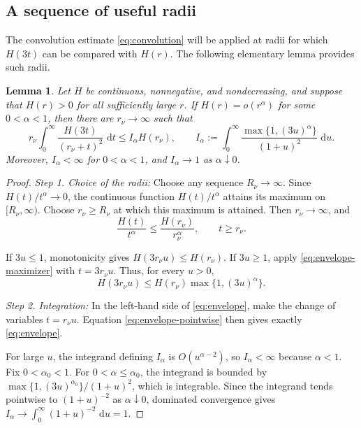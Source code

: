 \documentclass[12pt,letterpaper,reqno]{amsart}
\newtheorem{lem}[thm]{Lemma}
\theoremstyle{definition}
\numberwithin{equation}{section}
\newcommand{\dd}{\,\mathrm d}
\begin{document}
\subsection{A sequence of useful radii}

The convolution estimate \eqref{eq:convolution} will be applied at
radii for which \(H(3t)\) can be compared with \(H(r)\). The following
elementary lemma provides such radii.

\begin{lem}\label{lem:envelope}
Let \(H\) be continuous, nonnegative, and nondecreasing, and suppose
that \(H(r)>0\) for all sufficiently large \(r\). If
\(H(r)=o(r^\alpha)\) for some \(0<\alpha<1\), then there are
\(r_\nu\to\infty\) such that
\begin{equation}\label{eq:envelope}
 r_\nu\int_0^\infty
 \frac{H(3t)}{(r_\nu+t)^2}\,\dd t
 \leq
 I_\alpha H(r_\nu),
 \qquad
 I_\alpha
 :=
 \int_0^\infty
 \frac{\max\{1,(3u)^\alpha\}}{(1+u)^2}\,\dd u.
\end{equation}
Moreover, \(I_\alpha<\infty\) for \(0<\alpha<1\), and
\(I_\alpha\to1\) as \(\alpha\downarrow0\).
\end{lem}

\begin{proof}

\medskip\noindent
\emph{{Step 1. Choice of the radii:}}
Choose any sequence \(R_\nu\to\infty\). Since
\(H(t)/t^\alpha\to0\), the continuous function
\(H(t)/t^\alpha\) attains its maximum on \([R_\nu,\infty)\).
Choose \(r_\nu\geq R_\nu\) at which this maximum is attained. Then
\(r_\nu\to\infty\), and
\begin{equation}\label{eq:envelope-maximizer}
 \frac{H(t)}{t^\alpha}
 \leq
 \frac{H(r_\nu)}{r_\nu^\alpha},
 \qquad
 t\geq r_\nu.
\end{equation}

If \(3u\leq1\), monotonicity gives
\(H(3r_\nu u)\leq H(r_\nu)\). If \(3u\geq1\), apply
\eqref{eq:envelope-maximizer} with \(t=3r_\nu u\). Thus, for every
\(u>0\),
\begin{equation}\label{eq:envelope-pointwise}
 H(3r_\nu u)
 \leq
 H(r_\nu)\max\{1,(3u)^\alpha\}.
\end{equation}


\medskip\noindent
\emph{{Step 2. Integration:}}
In the left-hand side of \eqref{eq:envelope}, make the change of
variables \(t=r_\nu u\). Equation
\eqref{eq:envelope-pointwise} then gives exactly
\eqref{eq:envelope}.

For large \(u\), the integrand defining \(I_\alpha\) is
\(O(u^{\alpha-2})\), so \(I_\alpha<\infty\) because \(\alpha<1\).
Fix \(0<\alpha_0<1\). For \(0<\alpha\leq\alpha_0\), the integrand is
bounded by
\(\max\{1,(3u)^{\alpha_0}\}/(1+u)^2\), which is integrable. Since the
integrand tends pointwise to \((1+u)^{-2}\) as \(\alpha\downarrow0\),
dominated convergence gives
\(I_\alpha\to\int_0^\infty(1+u)^{-2}\,\dd u=1\).
\end{proof}
\end{document}
